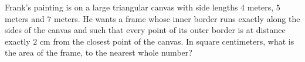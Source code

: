 Frank's painting is on a large triangular canvas with side lengths $4$ meters, $5$ meters and $7$ meters. He wants a frame whose inner border runs exactly along the sides of the canvas and such that every point of its outer border is at distance exactly $2$ cm from the closest point of the canvas. In square centimeters, what is the area of the frame, to the nearest whole number?
